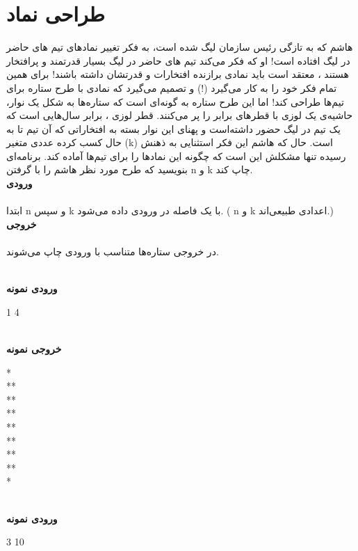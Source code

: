 \documentclass[]{article}
\newcommand{\inputsample}[1]{
    ~\\
    \textbf{ورودی نمونه}
    ~\\
    \begin{tcolorbox}[breakable,boxrule=0pt]
        \begin{latin}
            \large{
                #1
            }
        \end{latin}
    \end{tcolorbox}
}
\newcommand{\outputsample}[1]{
    ~\\
    \textbf{خروجی نمونه}

    \begin{tcolorbox}[breakable,boxrule=0pt]
        \begin{latin}
            \large{
                #1
            }
        \end{latin}
    \end{tcolorbox}
}
\begin{document}
\section{طراحی نماد}
هاشم که به تازگی رئیس سازمان لیگ شده است، به فکر تغییر نمادهای تیم های حاضر در لیگ افتاده است! او که فکر می‌کند تیم های حاضر در لیگ بسیار قدرتمند و پرافتخار هستند ، معتقد است باید نمادی برازنده افتخارات و قدرتشان داشته باشند! برای همین تمام فکر خود را به کار می‌گیرد (!) و تصمیم می‌گیرد که نمادی با طرح ستاره برای تیم‌ها طراحی کند! اما این طرح ستاره به گونه‌ای است که ستاره­‌ها به شکل یک نوار، حاشیه‌ی یک لوزی با قطرهای برابر را پر می‌کنند. قطر لوزی 
، برابر سال‌هایی است که یک تیم در لیگ حضور داشته‌است و پهنای این نوار بسته به افتخاراتی که آن تیم تا به حال کسب کرده عددی متغیر (k) است. حال که هاشم این فکر استثنایی به ذهنش رسیده تنها مشکلش این است که چگونه این نمادها را برای تیم‌ها آماده کند. برنامه‌ای بنویسید که طرح مورد نظر هاشم را با گرفتن n و k چاپ کند.\\

\textbf{ورودی}
\\\\
ابتدا n و سپس k با یک فاصله در ورودی داده می‌شود. ( n و k اعدادی طبیعی‌اند.)\\

\textbf{خروجی}
\\\\
در خروجی ستاره‌ها متناسب با ورودی چاپ می‌شوند.
\\
\newpage
\inputsample{
1 4
}

\outputsample{
\texttt{}\texttt{\char32}\texttt{\char32}\texttt{\char32}*\\
\texttt{\char32}\texttt{\char32}\texttt{\char32}*\texttt{\char32}*\\
\texttt{\char32}\texttt{\char32}*\texttt{\char32}\texttt{\char32}\texttt{\char32}*\\
\texttt{\char32}*\texttt{\char32}\texttt{\char32}\texttt{\char32}\texttt{\char32}\texttt{\char32}*\\
*\texttt{\char32}\texttt{\char32}\texttt{\char32}\texttt{\char32}\texttt{\char32}\texttt{\char32}\texttt{\char32}*\\
\texttt{\char32}*\texttt{\char32}\texttt{\char32}\texttt{\char32}\texttt{\char32}\texttt{\char32}*\\ 
\texttt{\char32}\texttt{\char32}*\texttt{\char32}\texttt{\char32}\texttt{\char32}*\\
\texttt{\char32}\texttt{\char32}\texttt{\char32}*\texttt{\char32}*\\
\texttt{\char32}\texttt{\char32}\texttt{\char32}\texttt{\char32}*
}
\newpage
\inputsample{
3 10
}
\end{document}
